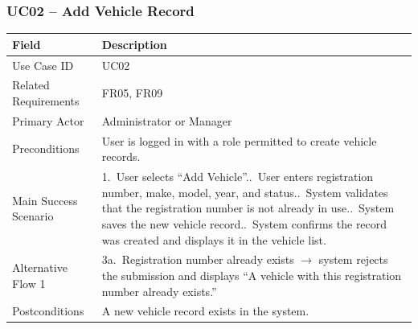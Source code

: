\documentclass[11pt,a4paper]{article}
\begin{document}
\subsubsection*{UC02 -- Add Vehicle Record}
\begin{longtable}{@{}p{3.2cm}p{11.3cm}@{}}
\toprule
Field & Description \\
\midrule
\endhead
Use Case ID & UC02 \\
Related Requirements & FR05, FR09 \\
Primary Actor & Administrator or Manager \\
Preconditions & User is logged in with a role permitted to create
vehicle records. \\
Main Success Scenario &
1.\ User selects ``Add Vehicle''.\newline
2.\ User enters registration number, make, model, year, and status.\newline
3.\ System validates that the registration number is not already in
use.\newline
4.\ System saves the new vehicle record.\newline
5.\ System confirms the record was created and displays it in the
vehicle list. \\
Alternative Flow 1 & 3a.\ Registration number already exists
$\rightarrow$ system rejects the submission and displays ``A vehicle
with this registration number already exists.'' \\
Postconditions & A new vehicle record exists in the system. \\
\bottomrule
\end{longtable}
\end{document}

